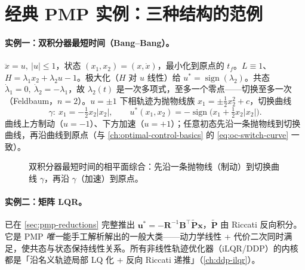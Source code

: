\section{经典 PMP 实例：三种结构的范例}
\label{sec:pmp-examples}

\paragraph{实例一：双积分器最短时间（Bang--Bang）。}
$\ddot x=u,\ |u|\le1$，状态 $(x_1,x_2)=(x,\dot x)$，最小化到原点的 $t_f$。$L\equiv1$、$H=\lambda_1 x_2+\lambda_2 u-1$。极大化（$H$ 对 $u$ 线性）给 $u^\ast=\operatorname{sign}(\lambda_2)$。共态 $\dot\lambda_1=0,\ \dot\lambda_2=-\lambda_1$，故 $\lambda_2(t)$ 是一次多项式，至多一个零点——切换至多一次（Feldbaum，$n=2$）。$u=\pm1$ 下相轨迹为抛物线族 $x_1=\pm\tfrac12 x_2^2+c$，切换曲线
\begin{equation}
  \gamma:\ x_1=-\tfrac12 x_2|x_2|,\qquad
  u^\ast(x_1,x_2)=-\operatorname{sign}\!\big(x_1+\tfrac12 x_2|x_2|\big).
  \label{eq:pmp-switch-curve}
\end{equation}
曲线上方制动（$u=-1$）、下方加速（$u=+1$）；任意初态先沿一条抛物线到切换曲线，再沿曲线到原点（与 \cref{ch:optimal-control-basics} 的 \cref{eq:oc-switch-curve} 一致）。

\begin{figure}[ht]
\centering
{}
\caption{双积分器最短时间的相平面综合：先沿一条抛物线（制动）到切换曲线 $\gamma$，再沿 $\gamma$（加速）到原点。}
\label{fig:pmp-bangbang}
\end{figure}

\paragraph{实例二：矩阵 LQR。}
已在 \cref{sec:pmp-reductions} 完整推出 $\mathbf u^\ast=-\mathbf R^{-1}\mathbf B^\top\tilde{\mathbf P}\mathbf x$，$\tilde{\mathbf P}$ 由 Riccati 反向积分。它是 PMP \emph{唯一}能手工解析解出的一般大类——动力学线性 + 代价二次同时满足，使共态与状态保持线性关系。所有非线性轨迹优化器（iLQR/DDP）的内核都是「沿名义轨迹局部 LQ 化 + 反向 Riccati 递推」（\cref{ch:ddp-ilqr}）。

